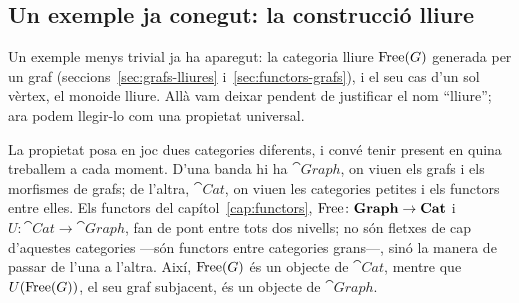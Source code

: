 \subsection{Un exemple ja conegut: la construcció lliure}\label{subsec:construccio-lliure}

Un exemple menys trivial ja ha aparegut: la categoria lliure
$\operatorname{Free}(G)$ generada per un graf (seccions~\ref{sec:grafs-lliures}
i~\ref{sec:functors-grafs}), i el seu cas d'un sol vèrtex, el monoide
lliure. Allà vam deixar pendent de justificar el nom
\enquote{lliure}; ara podem llegir-lo com una propietat universal.

La propietat posa en joc dues categories diferents, i convé tenir present en
quina treballem a cada moment. D'una banda hi ha $\cat{Graph}$, on viuen els
grafs i els morfismes de grafs; de l'altra, $\cat{Cat}$, on viuen les categories
petites i els functors entre elles. Els functors del
capítol~\ref{cap:functors}, $\operatorname{Free}\colon\mathbf{Graph}\to\mathbf{Cat}$ i
$U\colon\cat{Cat}\to\cat{Graph}$, fan de pont entre tots dos nivells; no són
fletxes de cap d'aquestes categories ---són functors entre categories grans---,
sinó la manera de passar de l'una a l'altra. Així, $\operatorname{Free}(G)$ és un objecte de
$\cat{Cat}$, mentre que $U(\operatorname{Free}(G))$, el seu graf subjacent, és un objecte de
$\cat{Graph}$.

